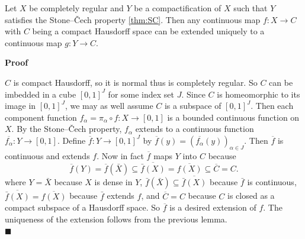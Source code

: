 \documentclass[main.tex]{subfiles}
\begin{document}
\begin{theorem}
    Let $X$ be completely regular and $Y$ be a compactification of $X$ such that $Y$ satisfies the Stone–Čech property \ref{thm:SC}. Then any continuous map $f: X \rightarrow C$ with $C$ being a compact Hausdorff space can be extended uniquely to a continuous map $g: Y \rightarrow C$.
\end{theorem}
\par \noindent \textbf{Proof} 
\par $C$ is compact Hausdorff, so it is normal thus is completely regular. So $C$ can be imbedded in a cube $[0, 1]^J$ for some index set $J$. Since $C$ is homeomorphic to its image in $[0, 1]^J$, we may as well assume $C$ is a subspace of $[0, 1]^J$. Then each component function $f_{\alpha} = \pi_{\alpha} \circ f: X \rightarrow [0, 1]$ is a bounded continuous function on $X$. By the Stone–Čech property, $f_{\alpha}$ extends to a continuous function $\overline{f_{\alpha}}: Y \rightarrow [0, 1]$. Define $\overline{f}: Y \rightarrow [0, 1]^J$ by $\overline{f}(y) = (\overline{f_{\alpha}}(y))_{\alpha \in J}$. Then $\overline{f}$ is continuous and extends $f$. Now in fact $\overline{f}$ maps $Y$ into $C$ because
\begin{equation}
    \overline{f}(Y) = \overline{f}(\bar{X}) \subseteq \overline{\bar{f}(X)} = \overline{f(X)} \subseteq \overline{C} = C.
\end{equation}
where $Y = \bar{X}$ because $X$ is dense in $Y$, $\bar{f}(\bar{X}) \subseteq \overline{\bar{f}(X)}$ because $\bar{f}$ is continuous, $\overline{\bar{f}(X)} = \overline{f(X)}$ because $\bar{f}$ extends $f$, and $\overline{C} = C$ because $C$ is closed as a compact subspace of a Hausdorff space. So $\overline{f}$ is a desired extension of $f$. The uniqueness of the extension follows from the previous lemma. 
\mbox{} \\ \null \hfill $\blacksquare$ 
\end{document}
